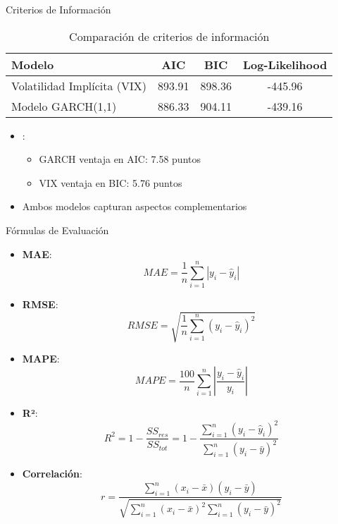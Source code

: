 \begin{frame}{Criterios de Información}
    \begin{table}
        \centering
        \begin{tabular}{lccc}
            \toprule
            \textbf{Modelo} & \textbf{AIC} & \textbf{BIC} & \textbf{Log-Likelihood} \\
            \midrule
            Volatilidad Implícita (VIX) & 893.91 & 898.36 & -445.96 \\
            Modelo GARCH(1,1) & 886.33 & 904.11 & -439.16 \\
            \bottomrule
        \end{tabular}
        \caption{Comparación de criterios de información}
    \end{table}
    
    \vspace{0.5em}
    
    \begin{itemize}
        \item<2-> :
        \begin{itemize}
            \item GARCH ventaja en AIC: 7.58 puntos
            \item VIX ventaja en BIC: 5.76 puntos
        \end{itemize}
        \item<3-> Ambos modelos capturan aspectos complementarios
    \end{itemize}
\end{frame}

\begin{frame}{Fórmulas de Evaluación}
    \begin{itemize}
        \item \textbf{MAE}:
        {\footnotesize $$MAE = \frac{1}{n}\sum_{i=1}^{n}|y_i - \hat{y}_i|$$}
  
        \item \textbf{RMSE}:
        {\footnotesize $$RMSE = \sqrt{\frac{1}{n}\sum_{i=1}^{n}(y_i - \hat{y}_i)^2}$$}
  
        \item \textbf{MAPE}:
        {\footnotesize $$MAPE = \frac{100}{n}\sum_{i=1}^{n}\left|\frac{y_i - \hat{y}_i}{y_i}\right|$$}
  
        \item \textbf{R²}:
        {\footnotesize $$R^2 = 1 - \frac{SS_{res}}{SS_{tot}} = 1 - \frac{\sum_{i=1}^{n}(y_i - \hat{y}_i)^2}{\sum_{i=1}^{n}(y_i - \bar{y})^2}$$}
  
        \item \textbf{Correlación}:
        {\footnotesize $$r = \frac{\sum_{i=1}^{n}(x_i - \bar{x})(y_i - \bar{y})}{\sqrt{\sum_{i=1}^{n}(x_i - \bar{x})^2 \sum_{i=1}^{n}(y_i - \bar{y})^2}}$$}
    \end{itemize}
\end{frame}

